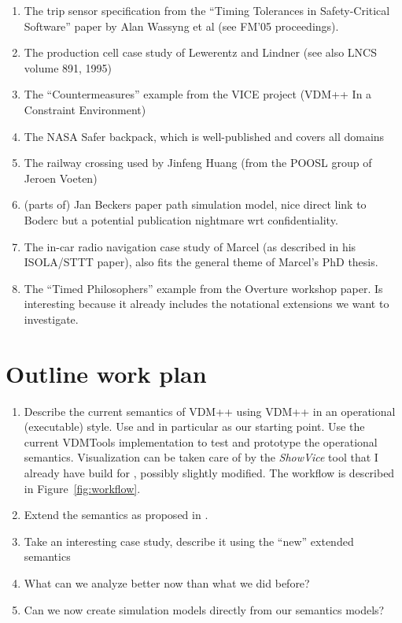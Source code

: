 \documentclass{llncs}
\begin{document}
\begin{enumerate}
\item The trip sensor specification from the ``Timing Tolerances in Safety-Critical Software''
paper by Alan Wassyng et al (see FM'05 proceedings).
\item The production cell case study of Lewerentz and Lindner (see also LNCS volume 891, 1995)
\item The ``Countermeasures'' example from the VICE project (VDM++ In a Constraint Environment)
\item The NASA Safer backpack, which is well-published and covers all domains
\item The railway crossing used by Jinfeng Huang (from the POOSL group of Jeroen Voeten)
\item (parts of) Jan Beckers paper path simulation model, nice direct link to Boderc but
a potential publication nightmare wrt confidentiality.
\item The in-car radio navigation case study of Marcel (as described in his ISOLA/STTT paper),
also fits the general theme of Marcel's PhD thesis.
\item The ``Timed Philosophers'' example from the Overture workshop paper. Is interesting
because it already includes the notational extensions we want to investigate.
\end{enumerate}

\section{Outline work plan}

\begin{enumerate}
\item Describe the current semantics of VDM++ using VDM++ in an operational (executable)
style. Use \cite{Lano98} and in particular \cite{Mukherjee&00} as our starting point. Use
the current VDMTools implementation to test and prototype the operational semantics.
Visualization can be taken care of by the \textit{ShowVice} tool that I already have
build for \cite{Verhoef2005}, possibly slightly modified. The workflow is described
in Figure~\ref{fig:workflow}.
\item Extend the semantics as proposed in \cite{Verhoef2005}.
\item Take an interesting case study, describe it using the ``new'' extended semantics
\item What can we analyze better now than what we did before?
\item Can we now create simulation models directly from our semantics models?
\end{enumerate}
\end{document}
